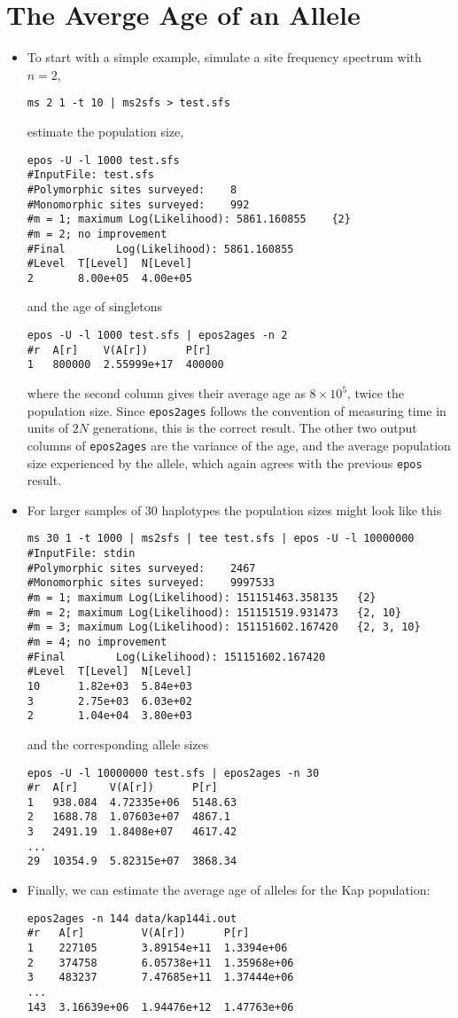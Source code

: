 \documentclass[a4paper, english]{article}
\newcommand{\ty}{\texttt}
\begin{document}
\section{The Averge Age of an Allele}
\begin{itemize}
  \item To start with a simple example, simulate a site frequency spectrum with $n=2$,
\begin{verbatim}
ms 2 1 -t 10 | ms2sfs > test.sfs
\end{verbatim}
estimate the population size,
\begin{verbatim}
epos -U -l 1000 test.sfs
#InputFile:	test.sfs
#Polymorphic sites surveyed:	8
#Monomorphic sites surveyed:	992
#m = 1; maximum Log(Likelihood): 5861.160855	{2}
#m = 2; no improvement
#Final        Log(Likelihood): 5861.160855
#Level  T[Level]  N[Level]
2       8.00e+05  4.00e+05
\end{verbatim}
and the age of singletons
\begin{verbatim}
epos -U -l 1000 test.sfs | epos2ages -n 2
#r  A[r]    V(A[r])      P[r]
1   800000  2.55999e+17  400000
\end{verbatim}
where the second column gives their average age as $8\times 10^5$,
twice the population size. Since \ty{epos2ages} follows the convention
of measuring time in units of $2N$ generations, this is the correct
result. The other two output columns of \ty{epos2ages} are the
variance of the age, and the average population size experienced by
the allele, which again agrees with the previous \ty{epos} result.
\item For larger samples of 30 haplotypes the population sizes might look like this
\begin{verbatim}
ms 30 1 -t 1000 | ms2sfs | tee test.sfs | epos -U -l 10000000 
#InputFile:	stdin
#Polymorphic sites surveyed:	2467
#Monomorphic sites surveyed:	9997533
#m = 1; maximum Log(Likelihood): 151151463.358135	{2}
#m = 2; maximum Log(Likelihood): 151151519.931473	{2, 10}
#m = 3; maximum Log(Likelihood): 151151602.167420	{2, 3, 10}
#m = 4; no improvement
#Final        Log(Likelihood): 151151602.167420
#Level  T[Level]  N[Level]
10      1.82e+03  5.84e+03
3       2.75e+03  6.03e+02
2       1.04e+04  3.80e+03
\end{verbatim}
and the corresponding allele sizes
\begin{verbatim}
epos -U -l 10000000 test.sfs | epos2ages -n 30
#r  A[r]     V(A[r])      P[r]
1   938.084  4.72335e+06  5148.63
2   1688.78  1.07603e+07  4867.1
3   2491.19  1.8408e+07   4617.42
...
29  10354.9  5.82315e+07  3868.34
\end{verbatim}
\item Finally, we can estimate the average age of alleles for the Kap
  population:
\begin{verbatim}
epos2ages -n 144 data/kap144i.out
#r   A[r]         V(A[r])      P[r]
1    227105       3.89154e+11  1.3394e+06
2    374758       6.05738e+11  1.35968e+06
3    483237       7.47685e+11  1.37444e+06
...
143  3.16639e+06  1.94476e+12  1.47763e+06
\end{verbatim}  
\end{itemize}
\end{document}
